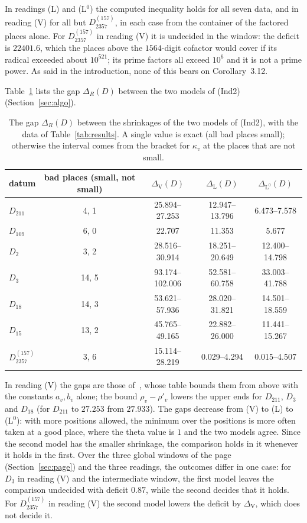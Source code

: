 \documentclass[11pt,a4paper]{article}
\begin{document}
In readings (L) and (L$^0$) the computed inequality holds for all seven
data, and in reading (V) for all but $D_{2357}^{(157)}$, in each case from the container of the factored places
alone. For $D_{2357}^{(157)}$ in reading (V) it is undecided in the window: the deficit is $22401.6$, which the places
above the $1564$-digit cofactor would cover if its radical exceeded about $10^{521}$; its prime factors all exceed
$10^6$ and it is not a prime power. As said in the introduction, none of this bears on Corollary~3.12.

Table~\ref{tab:gap} lists the gap $\Delta_R(D)$ between the two models of (Ind2) (Section~\ref{sec:algo}).

\begin{table}[H]
\centering\small
\begin{tabular}{lcccc}
\toprule
datum & bad places (small, not small) & $\Delta_{\mathrm V}(D)$ & $\Delta_{\mathrm L}(D)$ & $\Delta_{\mathrm L^0}(D)$\\
\midrule
$D_{211}$ & 4, 1 & 25.894--27.253 & 12.947--13.796 & 6.473--7.578\\
$D_{109}$ & 6, 0 & 22.707 & 11.353 & 5.677\\
$D_{2}$ & 3, 2 & 28.516--30.914 & 18.251--20.649 & 12.400--14.798\\
$D_{3}$ & 14, 5 & 93.174--102.006 & 52.581--60.758 & 33.003--41.788\\
$D_{18}$ & 14, 3 & 53.621--57.936 & 28.020--31.821 & 14.501--18.559\\
$D_{15}$ & 13, 2 & 45.765--49.165 & 22.882--26.000 & 11.441--15.267\\
$D_{2357}^{(157)}$ & 3, 6 & 15.114--28.219 & 0.029--4.294 & 0.015--4.507\\
\bottomrule
\end{tabular}
\caption{The gap $\Delta_R(D)$ between the shrinkages of the two models of (Ind2), with the data of
Table~\ref{tab:results}. A single value is exact (all bad places small); otherwise the interval comes from the
bracket for $\kappa_v$ at the places that are not small.}\label{tab:gap}
\end{table}

In reading (V) the gaps are those of~\cite[\S5]{Gap}, whose table bounds them from above with the constants
$a_v,b_v$ alone; the bound $\rho_v-\rho'_v$ lowers the upper ends for $D_{211}$, $D_3$ and $D_{18}$ (for $D_{211}$ to
$27.253$ from $27.933$). The gaps decrease from (V) to (L) to (L$^0$): with more positions allowed, the minimum over the
positions is more often taken at a good place, where the theta value is $1$ and the two models agree. Since the
second model has the smaller shrinkage, the comparison holds in it whenever it holds in the first. Over the three
global windows of the page (Section~\ref{sec:page}) and the three readings, the outcomes differ in one case: for $D_3$
in reading (V) and the intermediate window, the first model
leaves the comparison undecided with deficit $0.87$, while the second decides that it holds. For $D_{2357}^{(157)}$ in
reading (V) the second model lowers the deficit by $\Delta_{\mathrm V}$, which does not decide it.
\end{document}
